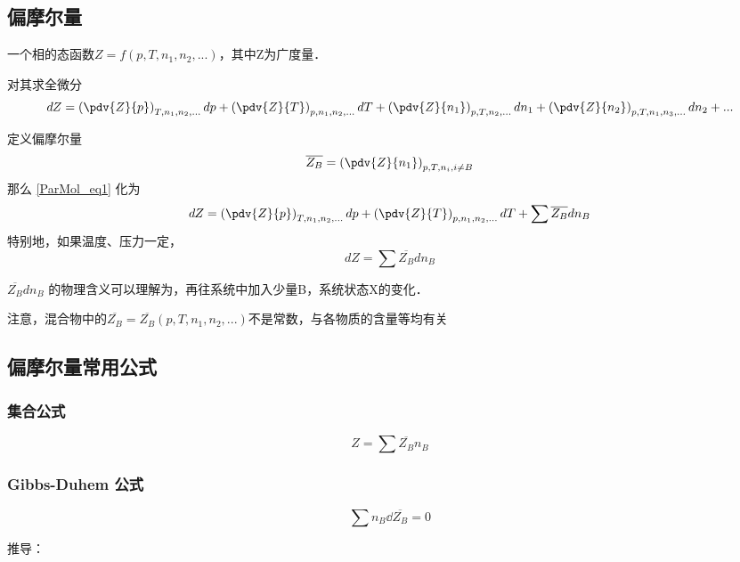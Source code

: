 
\subsection{偏摩尔量}
一个相的态函数$Z=f(p,T,n_1,n_2,...)$，其中Z为广度量．

对其求全微分  
\begin{equation}\label{ParMol_eq1}
dZ = \left(\pdv{Z}{p}\right)_{T,n_1,n_2,...}dp + \left(\pdv{Z}{T}\right)_{p,n_1,n_2,...}dT+\left(\pdv{Z}{n_1}\right)_{p,T,n_2,...}dn_1+\left(\pdv{Z}{n_2}\right)_{p,T,n_1,n_3,...}dn_2+...
\end{equation}

定义偏摩尔量
\begin{equation}
\overline {Z_B} = \left(\pdv{Z}{n_1}\right)_{p,T,n_i, i \neq B} 
\end{equation}
那么 \autoref{ParMol_eq1} 化为 
\begin{equation}
dZ = \left(\pdv{Z}{p}\right)_{T,n_1,n_2,...}dp + \left(\pdv{Z}{T}\right)_{p,n_1,n_2,...}dT+\sum \overline {Z_B} dn_B
\end{equation}
特别地，如果温度、压力一定，
\begin{equation}\label{ParMol_eq3}
dZ = \sum \overline {Z_B} dn_B
\end{equation}

$\overline {Z_B} d n_B$ 的物理含义可以理解为，再往系统中加入少量B，系统状态X的变化．

注意，混合物中的$\overline {Z_B}=\overline {Z_B}(p,T,n_1,n_2,...)$不是常数，与各物质的含量等均有关

\subsection{偏摩尔量常用公式}
\subsubsection{集合公式}
\begin{equation}\label{ParMol_eq2}
Z=\sum \overline {Z_B}  n_B
\end{equation}
\subsubsection{Gibbs-Duhem 公式}
\begin{equation}
\sum n_B \dd {\overline {Z_B}} = 0
\end{equation}

推导：

